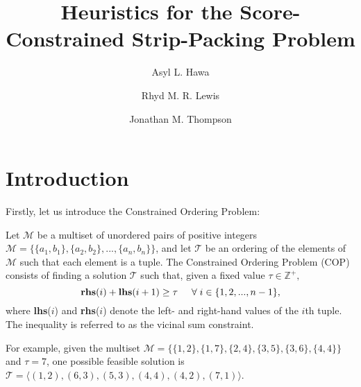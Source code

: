 \documentclass[oribibl]{llncs}
\begin{document}
\title{Heuristics for the Score-Constrained Strip-Packing Problem}
\author{Asyl L. Hawa \and Rhyd M. R. Lewis \and Jonathan M. Thompson}

\maketitle

\begin{abstract}
	
\end{abstract}

\section{Introduction}
\label{sec:intro}

Firstly, let us introduce the Constrained Ordering Problem:

\begin{definition}
	\label{defn:cop}
	Let $\mathcal{M}$ be a multiset of unordered pairs of positive integers $\mathcal{M} = \{\{a_1, b_1\}, \{a_2,b_2\},...,\{a_n,b_n\}\}$, and let $\mathcal{T}$ be an ordering of the elements of $\mathcal{M}$ such that each element is a tuple. The Constrained Ordering Problem (COP) consists of finding a solution $\mathcal{T}$ such that, given a fixed value $\tau \in \mathbb{Z}^{+},$
	\begin{equation}
		\label{eqn:cop}
		\textup{\textbf{rhs}}(i) + \textup{\textbf{lhs}}(i+1) \geq \tau \hspace{5mm} \forall \hspace{1mm} i \in \{1,2,..., n-1\},
	\end{equation}
	where \textup{\textbf{lhs}($i$)} and \textup{\textbf{rhs}($i$)} denote the left- and right-hand values of the $i$th tuple. The inequality is referred to as the \textup{vicinal sum constraint}.
\end{definition}

For example, given the multiset $\mathcal{M} = \{\{1,2\}, \{1,7\}, \{2,4\}, \{3,5\}, \{3,6\}, \{4,4\}\}$ and $\tau = 7$, one possible feasible solution is $\mathcal{T} = \langle(1,2), (6,3), (5,3), (4,4), (4,2), (7,1) \rangle$.
\end{document}
